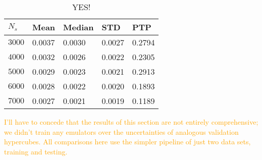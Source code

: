 \begin{table}[ht!]
\centering
\begin{tabular}{l|l|l|l|l}
\hline
$N_s$ & Mean & Median & STD & PTP \\ \hline
$3000$ & 0.0037 & 0.0030 & 0.0027 & 0.2794 \\
$4000$ & 0.0032 & 0.0026 & 0.0022 & 0.2305 \\
$5000$ & 0.0029 & 0.0023 & 0.0021 & 0.2913 \\
$6000$ & 0.0028 & 0.0022 & 0.0020 & 0.1893 \\
$7000$ & 0.0027 & 0.0021 & 0.0019 & 0.1189 \\
\end{tabular}
	\cprotect\caption[$N_s$ Experiment: Percent Error Statistics]{YES!}
 \label{tab: Ns_experiment_percerr_stats}
\end{table}



\textcolor{orange}{I'll have to concede that the results of this section are 
not entirely comprehensive; we didn't train any emulators over the 
uncertainties of analogous validation hypercubes. All comparisons here use the
simpler pipeline of just two data sets, training and testing.}
